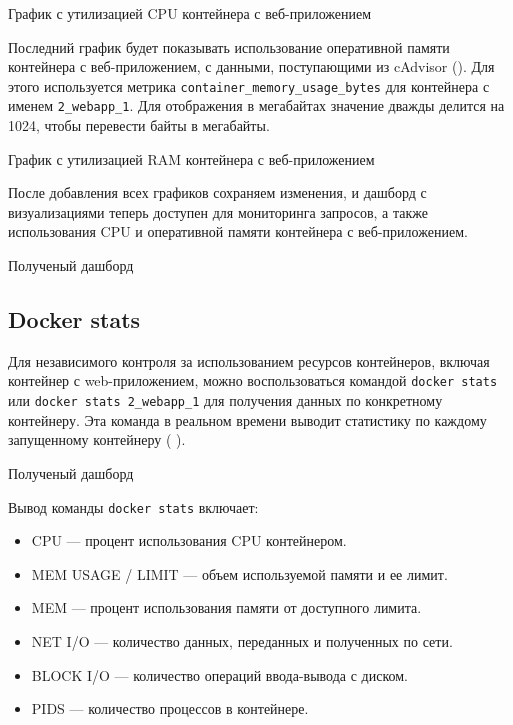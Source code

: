 \begin{image}
    \caption{График с утилизацией CPU контейнера с веб-приложением}
    \label{fig:graph:cpu}
\end{image}
\clearpage

Последний график будет показывать использование оперативной памяти контейнера с веб-приложением, с данными,
поступающими из cAdvisor ().
Для этого используется метрика \verb|container_memory_usage_bytes| для контейнера с именем \verb|2_webapp_1|.
Для отображения в мегабайтах значение дважды делится на 1024, чтобы перевести байты в мегабайты.

\begin{image}
    \caption{График с утилизацией RAM контейнера с веб-приложением}
    \label{fig:graph:ram}
\end{image}


После добавления всех графиков сохраняем изменения, и дашборд с визуализациями теперь доступен для мониторинга
запросов, а также использования CPU и оперативной памяти контейнера с веб-приложением.

\begin{image}
    \caption{Полученый дашборд}
    \label{fig:dashboard}
\end{image}

\subsection{Docker stats}


Для независимого контроля за использованием ресурсов контейнеров, включая контейнер с web-приложением, можно воспользоваться командой
\texttt{docker stats} или \texttt{docker stats 2\_webapp\_1} для получения данных по конкретному контейнеру.
Эта команда в реальном времени выводит статистику по каждому запущенному контейнеру ( ).

\begin{image}
    \caption{Полученый дашборд}
    \label{fig:docker:stats}
\end{image}

Вывод команды \texttt{docker stats} включает:

\begin{itemize}
    \item CPU --- процент использования CPU контейнером.
    \item MEM USAGE / LIMIT --- объем используемой памяти и ее лимит.
    \item MEM --- процент использования памяти от доступного лимита.
    \item NET I/O --- количество данных, переданных и полученных по сети.
    \item BLOCK I/O --- количество операций ввода-вывода с диском.
    \item PIDS --- количество процессов в контейнере.
\end{itemize}


